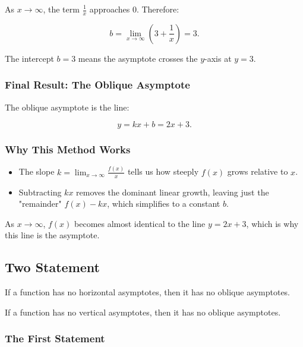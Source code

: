 \documentclass[a4paper,12pt]{article}
\begin{document}
As \( x \to \infty \), the term \( \frac{1}{x} \) approaches 0. Therefore:

\[
b = \lim_{x \to \infty} \left(3 + \frac{1}{x}\right) = 3.
\]

The intercept \( b = 3 \) means the asymptote crosses the \( y \)-axis at \( y = 3 \).

\hrulefill

\subsubsection{Final Result: The Oblique Asymptote}

The oblique asymptote is the line:

\[
y = kx + b = 2x + 3.
\]

\hrulefill

\subsubsection{Why This Method Works}
\begin{itemize}
\item 
The slope \( k = \lim_{x \to \infty} \frac{f(x)}{x} \) tells us how steeply \( f(x) \) grows relative to \( x \).

\item 
Subtracting \( kx \) removes the dominant linear growth, leaving just the "remainder" \( f(x) - kx \), which simplifies to a constant \( b \).

\end{itemize}

As \( x \to \infty \), \( f(x) \) becomes almost identical to the line \( y = 2x + 3 \), which is why this line is the asymptote.

\subsection{Two Statement}

\begin{qbox}
If a function has no horizontal asymptotes, then it has no oblique asymptotes.

If a function has no vertical asymptotes, then it has no oblique asymptotes.
\end{qbox}

\subsubsection{The First Statement}
\end{document}
